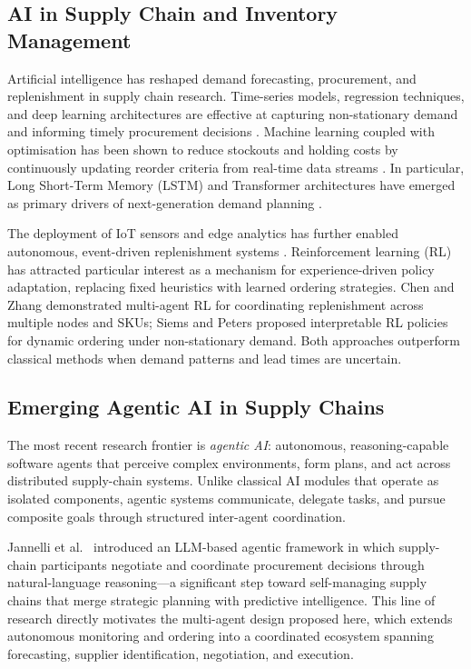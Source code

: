 \documentclass[utf8]{FrontiersinHarvard}
\begin{document}
	\subsection{AI in Supply Chain and Inventory Management}

	Artificial intelligence has reshaped demand forecasting, procurement,
	and replenishment in supply chain research.  Time-series models,
	regression techniques, and deep learning architectures are effective at
	capturing non-stationary demand and informing timely procurement decisions
	\cite{culot2024ai}.  Machine learning coupled with optimisation has been
	shown to reduce stockouts and holding costs by continuously updating reorder
	criteria from real-time data streams \cite{yilmaz2024aiinventory}.  In
	particular, Long Short-Term Memory (LSTM) and Transformer architectures
	have emerged as primary drivers of next-generation demand planning
	\cite{shukla2023review}.

	The deployment of IoT sensors and edge analytics has further enabled
	autonomous, event-driven replenishment systems \cite{duan2022iot}.
	Reinforcement learning (RL) has attracted particular interest as a
	mechanism for experience-driven policy adaptation, replacing fixed
	heuristics with learned ordering strategies.  Chen and Zhang
	\cite{chen2020multiproduct} demonstrated multi-agent RL for coordinating
	replenishment across multiple nodes and SKUs; Siems and Peters
	\cite{siems2023interpretable} proposed interpretable RL policies for
	dynamic ordering under non-stationary demand.  Both approaches outperform
	classical methods when demand patterns and lead times are uncertain.

	\subsection{Emerging Agentic AI in Supply Chains}

	The most recent research frontier is \emph{agentic AI}: autonomous,
	reasoning-capable software agents that perceive complex environments,
	form plans, and act across distributed supply-chain systems.  Unlike
	classical AI modules that operate as isolated components, agentic systems
	communicate, delegate tasks, and pursue composite goals through structured
	inter-agent coordination.

	Jannelli et al.\ \cite{jannelli2024agentic} introduced an LLM-based
	agentic framework in which supply-chain participants negotiate and
	coordinate procurement decisions through natural-language reasoning---a
	significant step toward self-managing supply chains that merge strategic
	planning with predictive intelligence.  This line of research directly
	motivates the multi-agent design proposed here, which extends autonomous
	monitoring and ordering into a coordinated ecosystem spanning forecasting,
	supplier identification, negotiation, and execution.
\end{document}

